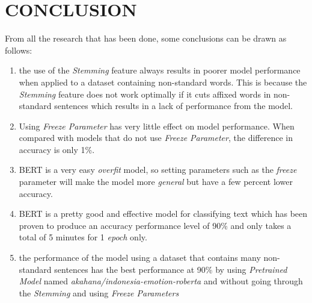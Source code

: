 \section{CONCLUSION}
\label{sec:kesimpulan}


From all the research that has been done, some conclusions can be drawn as follows:

\begin{enumerate}[nolistsep]

  \item the use of the \textit{Stemming} feature always results in poorer model performance when applied to a dataset containing non-standard words. This is because the \textit{Stemming} feature does not work optimally if it cuts affixed words in non-standard sentences which results in a lack of performance from the model.
  \item Using \textit{Freeze Parameter} has very little effect on model performance. When compared with models that do not use \textit{Freeze Parameter}, the difference in accuracy is only 1\%.
  \item BERT is a very easy \textit{overfit} model, so setting parameters such as the \textit{freeze} parameter will make the model more \textit{general} but have a few percent lower accuracy.
  \item BERT is a pretty good and effective model for classifying text which has been proven to produce an accuracy performance level of 90\% and only takes a total of 5 minutes for 1 \textit{epoch} only.
  \item the performance of the model using a dataset that contains many non-standard sentences has the best performance at 90\% by using \textit{Pretrained Model} named \textit{akahana/indonesia-emotion-roberta} and without going through the \textit{Stemming} and using \textit{Freeze Parameters}
  \end{enumerate}
